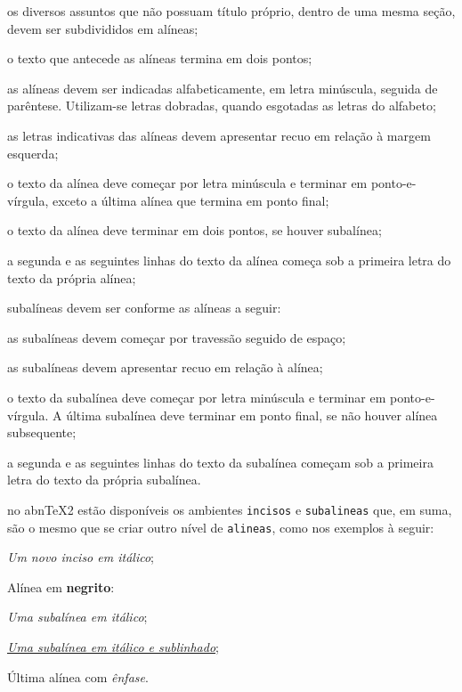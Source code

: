 \begin{alineas}

  \item os diversos assuntos que não possuam título próprio, dentro de uma mesma seção, devem ser subdivididos em alíneas; 
  \item o texto que antecede as alíneas termina em dois pontos;
  \item as alíneas devem ser indicadas alfabeticamente, em letra minúscula, seguida de parêntese. Utilizam-se letras dobradas, quando esgotadas as letras do alfabeto;
  \item as letras indicativas das alíneas devem apresentar recuo em relação à margem esquerda;
  \item o texto da alínea deve começar por letra minúscula e terminar em ponto-e-vírgula, exceto a última alínea que termina em ponto final;
  \item o texto da alínea deve terminar em dois pontos, se houver subalínea;
  \item a segunda e as seguintes linhas do texto da alínea começa sob a primeira letra do texto da própria alínea;
  \item subalíneas \cite[p. 4]{NBR6024:2012} devem ser conforme as alíneas a seguir:

  \begin{alineas}
     \item as subalíneas devem começar por travessão seguido de espaço;
     \item as subalíneas devem apresentar recuo em relação à alínea;
     \item o texto da subalínea deve começar por letra minúscula e terminar em ponto-e-vírgula. A última subalínea deve terminar em ponto final, se não houver alínea subsequente;
     \item a segunda e as seguintes linhas do texto da subalínea começam sob a primeira letra do texto da própria subalínea.
  \end{alineas}
  
  \item no abn\TeX2 estão disponíveis os ambientes \texttt{incisos} e \texttt{subalineas} que, em suma, são o mesmo que se criar outro nível de \texttt{alineas}, como nos exemplos à seguir:
  
  \begin{incisos}
    \item \textit{Um novo inciso em itálico};
  \end{incisos}
  
  \item Alínea em \textbf{negrito}:
  
  \begin{subalineas}
    \item \textit{Uma subalínea em itálico};
    \item \underline{\textit{Uma subalínea em itálico e sublinhado}}; 
  \end{subalineas}
  
  \item Última alínea com \emph{ênfase}.
  
\end{alineas}

